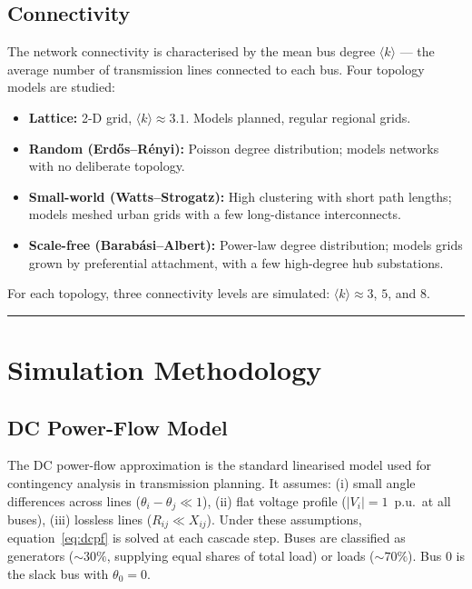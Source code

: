 \documentclass[12pt,a4paper]{article}
\begin{document}
\subsection{Connectivity}

The network connectivity is characterised by the mean bus degree
$\langle k \rangle$ — the average number of transmission lines
connected to each bus. Four topology models are studied:
\begin{itemize}
    \item \textbf{Lattice:} 2-D grid, $\langle k \rangle \approx 3.1$.
          Models planned, regular regional grids.
    \item \textbf{Random (Erd\H{o}s--R\'enyi):} Poisson degree
          distribution; models networks with no deliberate topology.
    \item \textbf{Small-world (Watts--Strogatz):} High clustering
          with short path lengths; models meshed urban grids with
          a few long-distance interconnects.
    \item \textbf{Scale-free (Barab\'asi--Albert):} Power-law degree
          distribution; models grids grown by preferential attachment,
          with a few high-degree hub substations.
\end{itemize}
For each topology, three connectivity levels are simulated:
$\langle k \rangle \approx 3$, $5$, and $8$.

\vspace{1em}
\hrule

\section{Simulation Methodology}
\label{sec:sim}

\subsection{DC Power-Flow Model}

The DC power-flow approximation is the standard linearised model used
for contingency analysis in transmission planning. It assumes:
(i) small angle differences across lines ($\theta_i - \theta_j \ll 1$),
(ii) flat voltage profile ($|V_i| = 1$~p.u.\ at all buses),
(iii) lossless lines ($R_{ij} \ll X_{ij}$). Under these assumptions,
equation~\eqref{eq:dcpf} is solved at each cascade step. Buses are
classified as generators ($\sim 30\%$, supplying equal shares of total
load) or loads ($\sim 70\%$). Bus 0 is the slack bus with
$\theta_0 = 0$.
\end{document}
